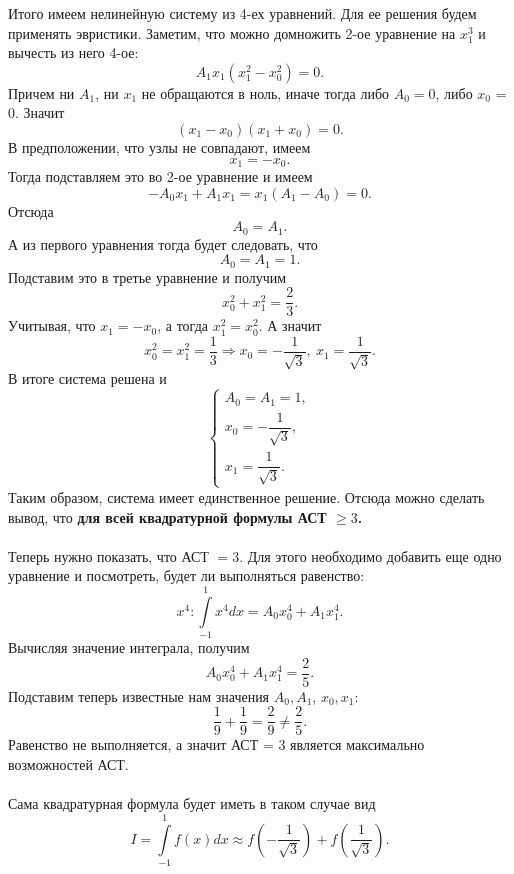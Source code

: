 \documentclass[a4paper, 12pt]{article}
\renewcommand{\geq}{\geqslant}
\begin{document}
	Итого имеем нелинейную систему из 4-ех уравнений. Для ее решения будем применять эвристики. Заметим, что можно домножить 2-ое уравнение на $x_1^3$ и вычесть из него 4-ое:
	$$A_1x_1(x_1^2 - x_0^2) = 0.$$
	Причем ни $A_1$, ни $x_1$ не обращаются в ноль, иначе тогда либо $A_0=0$, либо $x_0$ = 0. Значит $$(x_1-x_0)(x_1+x_0) = 0.$$
	В предположении, что узлы не совпадают, имеем $$x_1 = -x_0.$$
	Тогда подставляем это во 2-ое уравнение и имеем 
	$$-A_0x_1 + A_1x_1 = x_1(A_1 - A_0) = 0.$$
	Отсюда $$A_0 = A_1.$$
	А из первого уравнения тогда будет следовать, что $$A_0 = A_1 = 1.$$
	Подставим это в третье уравнение и получим $$x_0^2 + x_1^2 = \dfrac23.$$
	Учитывая, что $x_1 = -x_0$, а тогда $x_1^2 = x_0^2$. А значит $$x_0^2 = x_1^2 = \dfrac{1}{3}\Rightarrow x_0 = -\dfrac{1}{\sqrt3},\ x_1 = \dfrac{1}{\sqrt3}.$$
	В итоге система решена и $$\begin{cases}
		A_0 = A_1 = 1,\\
		x_0 = -\dfrac{1}{\sqrt3},\\
		x_1 = \dfrac{1}{\sqrt3}.
	\end{cases}$$
	Таким образом, система имеет единственное решение. Отсюда можно сделать вывод, что \textbf{для всей квадратурной формулы АСТ $\geq 3$.}\\\\
	Теперь нужно показать, что АСТ $= 3$. Для этого необходимо добавить еще одно уравнение и посмотреть, будет ли выполняться равенство:
	$$x^4 : \int\limits_{-1}^1 x^4dx = A_0x_0^4 + A_1x_1^4.$$
	Вычисляя значение интеграла, получим $$A_0x_0^4 + A_1x_1^4 = \dfrac25.$$
	Подставим теперь известные нам значения $A_0,A_1$, $x_0,x_1$:
	$$\dfrac{1}{9} + \dfrac{1}{9} = \dfrac29\ne \dfrac25.$$ 
	Равенство не выполняется, а значит АСТ = 3 является максимально возможностей АСТ.\\\\
	Сама квадратурная формула будет иметь в таком случае вид
	$$I = \int\limits_{-1}^{1} f(x)dx \approx f\left(-\dfrac{1}{\sqrt3}\right) + f\left(\dfrac{1}{\sqrt3}\right).$$
\end{document}
